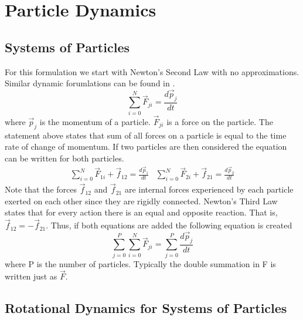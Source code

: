 \documentclass{article}
\begin{document}
\newpage


\section{Particle Dynamics}

\subsection{Systems of Particles}

For this formulation we start with Newton's Second Law with no
approximations. Similar dynamic forumlations can be found in \cite{etkins,
  phillips,nelson,astrodynamics}.
\begin{equation}
\sum\limits_{i=0}^N \vec{F}_{ji} = \frac{d\vec{p}_j}{dt}
\end{equation}
where $\vec{p}_j$ is the momentum of a particle. $\vec{F}_{ji}$ is a
force on the particle. The statement above states that sum of all
forces on a particle is equal to the time rate of change of
momentum. If two particles are then considered the equation can
be written for both particles.
\begin{equation}
\begin{matrix}
\sum\limits_{i=0}^N \vec{F}_{1i} + \vec{f}_{12} = \frac{d\vec{p}_1}{dt} &
\sum\limits_{i=0}^N \vec{F}_{2i} + \vec{f}_{21} = \frac{d\vec{p}_2}{dt} 
\end{matrix}
\end{equation}
Note that the forces $\vec{f}_{12}$ and $\vec{f}_{21}$ are internal forces
experienced by each particle exerted on each other since they are
rigidly connected. Newton's Third Law states that for every action
there is an equal and opposite reaction. That is, $\vec{f}_{12} = -\vec{f}_{21}$. Thus, if both equations are added the following equation is
created
\begin{equation}
\sum\limits_{j=0}^P \sum\limits_{i=0}^N \vec{F}_{ji} =
\sum\limits_{j=0}^P \frac{d\vec{p}_j}{dt}
\end{equation}
where P is the number of particles. Typically the double summation
in F is written just as $\vec{F}$.

\subsection{Rotational Dynamics for Systems of Particles}
\end{document}

